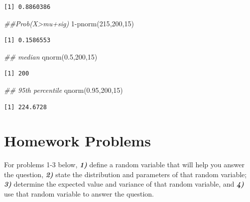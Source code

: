 \documentclass[
  letterpaper,
  DIV=11,
  numbers=noendperiod]{scrreprt}
\newenvironment{Shaded}{\begin{snugshade}}{\end{snugshade}}
\newcommand{\DecValTok}[1]{\textcolor[rgb]{0.68,0.00,0.00}{#1}}
\newcommand{\DocumentationTok}[1]{\textcolor[rgb]{0.37,0.37,0.37}{\textit{#1}}}
\newcommand{\FloatTok}[1]{\textcolor[rgb]{0.68,0.00,0.00}{#1}}
\newcommand{\FunctionTok}[1]{\textcolor[rgb]{0.28,0.35,0.67}{#1}}
\newcommand{\NormalTok}[1]{\textcolor[rgb]{0.00,0.23,0.31}{#1}}
\newcommand{\SpecialCharTok}[1]{\textcolor[rgb]{0.37,0.37,0.37}{#1}}
\begin{document}
\begin{verbatim}
[1] 0.8860386
\end{verbatim}

\begin{Shaded}
\begin{Highlighting}[]
\DocumentationTok{\#\#Prob(X\textgreater{}mu+sig)}
\DecValTok{1}\SpecialCharTok{{-}}\FunctionTok{pnorm}\NormalTok{(}\DecValTok{215}\NormalTok{,}\DecValTok{200}\NormalTok{,}\DecValTok{15}\NormalTok{)}
\end{Highlighting}
\end{Shaded}

\begin{verbatim}
[1] 0.1586553
\end{verbatim}

\begin{Shaded}
\begin{Highlighting}[]
\DocumentationTok{\#\# median}
\FunctionTok{qnorm}\NormalTok{(}\FloatTok{0.5}\NormalTok{,}\DecValTok{200}\NormalTok{,}\DecValTok{15}\NormalTok{)}
\end{Highlighting}
\end{Shaded}

\begin{verbatim}
[1] 200
\end{verbatim}

\begin{Shaded}
\begin{Highlighting}[]
\DocumentationTok{\#\# 95th percentile}
\FunctionTok{qnorm}\NormalTok{(}\FloatTok{0.95}\NormalTok{,}\DecValTok{200}\NormalTok{,}\DecValTok{15}\NormalTok{)}
\end{Highlighting}
\end{Shaded}

\begin{verbatim}
[1] 224.6728
\end{verbatim}

\section{Homework Problems}\label{homework-problems-12}

For problems 1-3 below, \textbf{\emph{1)}} define a random variable that
will help you answer the question, \textbf{\emph{2)}} state the
distribution and parameters of that random variable; \textbf{\emph{3)}}
determine the expected value and variance of that random variable, and
\textbf{\emph{4)}} use that random variable to answer the question.
\end{document}
